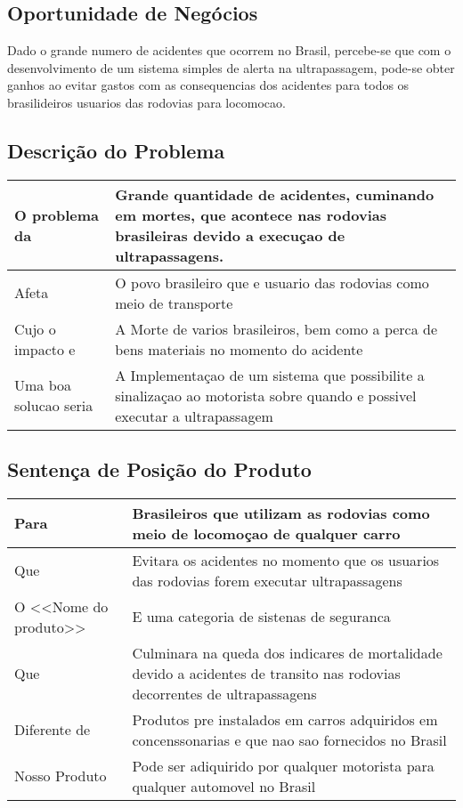 \subsection{Oportunidade de Negócios}
Dado o grande numero de acidentes que ocorrem no Brasil, percebe-se que com o desenvolvimento de um sistema simples de alerta na ultrapassagem, pode-se obter ganhos ao evitar gastos com as consequencias dos acidentes para todos os brasilideiros usuarios das rodovias para locomocao. 

\subsection{Descrição do Problema}
\begin{tabular}{| l |  p{7cm} |}
\hline
O problema da & Grande quantidade de acidentes, cuminando em mortes, que acontece nas rodovias brasileiras devido a execuçao de ultrapassagens.  \\
\hline
Afeta & O povo brasileiro que e usuario das rodovias como meio de transporte \\
\hline
Cujo o impacto e & A Morte de varios brasileiros, bem como a perca de bens materiais no momento do acidente\\
\hline
Uma boa solucao seria & A Implementaçao de um sistema que possibilite a sinalizaçao ao motorista sobre quando e possivel executar a ultrapassagem \\
\hline
\end{tabular}

\subsection{Sentença de Posição do Produto}
\begin{tabular}{| l |  p{7cm} |}
\hline
Para & Brasileiros que utilizam as rodovias como meio de locomoçao de qualquer carro \\
\hline
Que & Evitara os acidentes no momento que os usuarios das rodovias forem executar ultrapassagens \\
\hline
O <<Nome do produto>> & E uma categoria de sistenas de seguranca\\
\hline
Que & Culminara na queda dos indicares de mortalidade devido a acidentes de transito nas rodovias decorrentes de ultrapassagens \\
\hline
Diferente de & Produtos pre instalados em carros adquiridos em concenssonarias e que nao sao fornecidos no Brasil  \\
\hline
Nosso Produto & Pode ser adiquirido por qualquer motorista para qualquer automovel no Brasil\\
\hline
\end{tabular}


